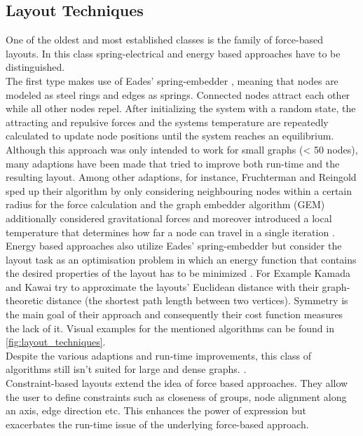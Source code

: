 \subsection{Layout Techniques}
One of the oldest and most established classes is the family of force-based layouts. In this class spring-electrical and energy based approaches have to be distinguished.\\ 
The first type makes use of Eades' spring-embedder \cite{Gibson2013}, meaning that nodes are modeled as steel rings and edges as springs. Connected nodes attract each other while all other nodes repel. After initializing the system with a random state, the attracting and repulsive forces and the systems temperature are repeatedly calculated to update node positions until the system reaches an equilibrium. Although this approach was only intended to work for small graphs (< 50 nodes), many adaptions have been made that tried to improve both run-time and the resulting layout. Among other adaptions, for instance, Fruchterman and Reingold\cite{Fruchterman1991} sped up their algorithm by only considering neighbouring nodes within a certain radius for the force calculation and the graph embedder algorithm (GEM) additionally considered gravitational forces and moreover introduced a local temperature that determines how far a node can travel in a single iteration \cite{Gibson2013}.\\
Energy based approaches also utilize Eades' spring-embedder but consider the layout task as an optimisation problem in which an energy function that contains the desired properties of the layout has to be minimized \cite{Gibson2013}. For Example Kamada and Kawai \cite{Kamada1989} try to approximate the layouts' Euclidean distance with their graph-theoretic distance (the shortest path length between two vertices). Symmetry is the main goal of their approach and consequently their cost function measures the lack of it.
Visual examples for the mentioned algorithms can be found in \autoref{fig:layout_techniques}.\\
Despite the various adaptions and run-time improvements, this class of algorithms still isn't suited for large and dense graphs.\cite{Gibson2013} \cite{VonLandesberger2011}.
\\
Constraint-based layouts extend the idea of force based approaches. They allow the user to define constraints such as closeness of groups, node alignment along an axis, edge direction etc. This enhances the power of expression but exacerbates the run-time issue of the underlying force-based approach\cite{VonLandesberger2011}.


